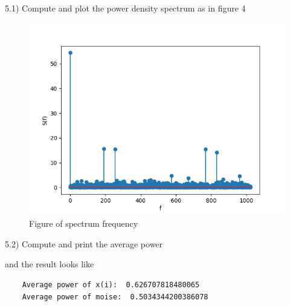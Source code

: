 \documentclass[12pt]{article}
\begin{document}
5.1) Compute and plot the power density spectrum as in figure 4
\begin{figure}[h!]
    \centering
    \includegraphics[width=\linewidth]{../pb5_1}
    \caption{Figure of spectrum frequency}
\end{figure}

5.2) Compute and print the average power

and the result looks like
\begin{lstlisting}
    Average power of x(i):  0.626707818480065
    Average power of moise:  0.5034344200386078
\end{lstlisting}
\end{document}

